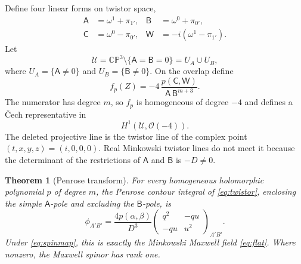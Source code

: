 \documentclass[11pt,a4paper]{article}
\numberwithin{equation}{section}
\newtheorem{theorem}{Theorem}[section]
\theoremstyle{remark}
\newcommand{\CP}{\mathbb{CP}}
\begin{document}
Define four linear forms on twistor space,
\begin{align}
 \mathsf A&=\omega^1+\pi_{1'},
 &\mathsf B&=\omega^0+\pi_{0'},\nonumber\\
 \mathsf C&=\omega^0-\pi_{0'},
 &\mathsf W&=-i(\omega^1-\pi_{1'}).
 \label{eq:twforms}
\end{align}
Let
\begin{equation}
 \mathcal U
 =\CP^3\setminus\{\mathsf A=\mathsf B=0\}
 =U_A\cup U_B,
\end{equation}
where \(U_A=\{\mathsf A\neq0\}\) and \(U_B=\{\mathsf B\neq0\}\). On the overlap define
\begin{equation}\label{eq:twistor}
 \boxed{
 f_p(Z)
 =-4\,\frac{p(\mathsf C,\mathsf W)}
 {\mathsf A\,\mathsf B^{m+3}} .}
\end{equation}
The numerator has degree \(m\), so \(f_p\) is homogeneous of degree \(-4\) and defines a \v{C}ech representative in
\[
 H^1(\mathcal U,\mathcal O(-4)).
\]
The deleted projective line is the twistor line of the complex point \((t,x,y,z)=(i,0,0,0)\). Real Minkowski twistor lines do not meet it because the determinant of the restrictions of \(\mathsf A\) and \(\mathsf B\) is \(-D\neq0\).

\begin{theorem}[Penrose transform]\label{thm:penrose}
For every homogeneous holomorphic polynomial \(p\) of degree \(m\), the Penrose contour integral of \eqref{eq:twistor}, enclosing the simple \(\mathsf A\)-pole and excluding the \(\mathsf B\)-pole, is
\begin{equation}\label{eq:spinresult}
 \phi_{A'B'}
 =\frac{4p(\alpha,\beta)}{D^3}
 \begin{pmatrix}
 q^2&-qu\\
 -qu&u^2
 \end{pmatrix}_{A'B'}.
\end{equation}
Under \eqref{eq:spinmap}, this is exactly the Minkowski Maxwell field \eqref{eq:flat}. Where nonzero, the Maxwell spinor has rank one.
\end{theorem}
\end{document}
